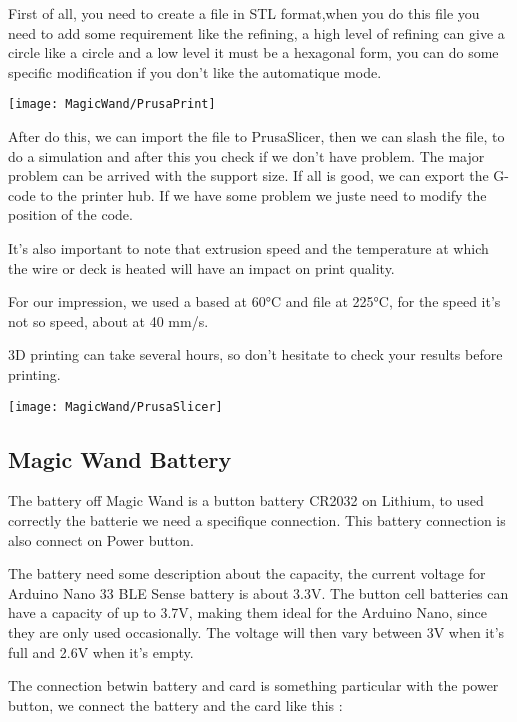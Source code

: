 First of all, you need to create a file in STL format,when you do this file you need to add some requirement like the refining, a high level of refining can give a circle like a circle and a low level it must be a hexagonal form, you can do some specific modification if you don't like the automatique mode.

\begin{center}
    \texttt{[image: MagicWand/PrusaPrint]}
\end{center}

After do this, we can import the file to PrusaSlicer, then we can slash the file, to do a simulation and after this you check if we don't have problem. The major problem can be arrived with the support size. If all is good, we can export the G-code to the printer hub. If we have some problem we juste need to modify the position of the code. 


It's also important to note that extrusion speed and the temperature at which the wire or deck is heated will have an impact on print quality. 

For our impression, we used a based at 60°C and file at 225°C, for the speed it's not so  speed, about at 40 mm/s. 

3D printing can take several hours, so don't hesitate to check your results before printing. 

\begin{center}
    \texttt{[image: MagicWand/PrusaSlicer]}
\end{center}


\subsection{Magic Wand Battery}

The battery off Magic Wand is a button battery CR2032 on Lithium, to used correctly the batterie we need a specifique connection. This battery connection is also connect on Power button. 

The battery need some description about the capacity, the current voltage for Arduino Nano 33 BLE Sense battery is about 3.3V. The button cell batteries can have a capacity of up to 3.7V, making them ideal for the Arduino Nano, since they are only used occasionally. The voltage will then vary between 3V when it's full and 2.6V when it's empty. 


The connection betwin battery and card is something particular with the power button, we connect the battery and the card like this :  

